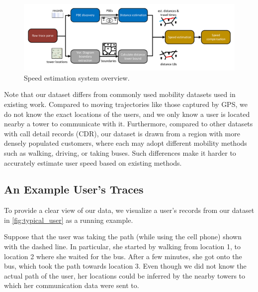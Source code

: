 \begin{figure}
    \centering
    \includegraphics[width=\linewidth]{./figures/system_overview.pdf}
    \vspace{-0.4in}
    \caption{Speed estimation system overview.}
    \label{fig:system_overview}
    \vspace{-0.1in}
\end{figure}



Note that our dataset differs from commonly used mobility datasets used in existing work.
Compared to moving trajectories like those captured by GPS,
we do not know the exact locations of the users, and we only know a user is located nearby a tower to communicate with it.
Furthermore, compared to other datasets with call detail records (CDR),
our dataset is drawn from a region with more densely populated customers, where each may adopt different mobility methods such as walking, driving, or taking buses.
Such differences make it harder to accurately estimate user speed based on existing methods. %


\subsection{An Example User's Traces}

To provide a clear view of our data, we visualize a user's records from our dataset in \autoref{fig:typical_user} as a running example.


Suppose that the user was taking the path (while using the cell phone) shown with the dashed line.
In particular, she started by walking from location 1, to location 2 where she waited for the bus.
After a few minutes, she got onto the bus, which took the path towards location 3.
Even though we did not know the actual path of the user,
her locations could be inferred by the nearby towers to which her communication data were sent to.


